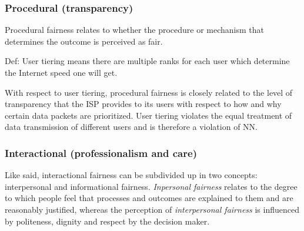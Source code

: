 \subsubsection{Procedural (transparency)}
Procedural fairness relates to whether the procedure or mechanism that determines the outcome is perceived as fair.

Def: User tiering means there are multiple ranks for each user which determine the Internet speed one will get.

With respect to user tiering, procedural fairness is closely related to the level of transparency that the ISP provides to its users with respect to how and why certain data packets are prioritized. User tiering violates the equal treatment of data transmission of different users and is therefore a violation of NN.

\subsubsection{Interactional (professionalism and care)}
Like said, interactional fairness can be subdivided up in two concepts: interpersonal and informational fairness. \emph{Inpersonal fairness} relates to the degree to which people feel that processes and outcomes are explained to them and are reasonably justified, whereas the perception of \emph{interpersonal fairness} is influenced by politeness, dignity and respect by the decision maker.